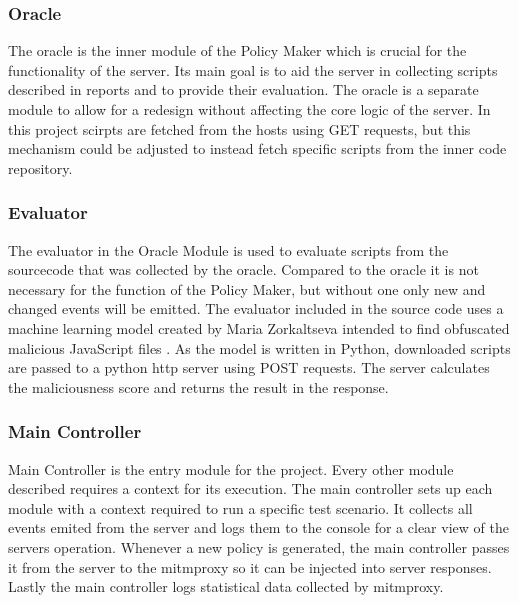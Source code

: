 \begin{description}
\subsubsection{Oracle}
The oracle is the inner module of the Policy Maker which is crucial for the functionality of the server.
Its main goal is to aid the server in collecting scripts described in reports and to provide their evaluation.
The oracle is a separate module to allow for a redesign without affecting the core logic of the server.
In this project scirpts are fetched from the hosts using GET requests, but this mechanism could be adjusted to instead fetch specific scripts from the inner code repository.

\subsubsection{Evaluator}
The evaluator in the Oracle Module is used to evaluate scripts from the sourcecode that was collected by the oracle.
Compared to the oracle it is not necessary for the function of the Policy Maker, but without one only new and changed events will be emitted.
The evaluator included in the source code uses a machine learning model created by Maria Zorkaltseva intended to find obfuscated malicious JavaScript files \cite{evaluator}.
As the model is written in Python, downloaded scripts are passed to a python http server using POST requests.
The server calculates the maliciousness score and returns the result in the response.


\subsubsection{Main Controller}
Main Controller is the entry module for the project.
Every other module described requires a context for its execution.
The main controller sets up each module with a context required to run a specific test scenario.
It collects all events emited from the server and logs them to the console for a clear view of the servers operation.
Whenever a new policy is generated, the main controller passes it from the server to the mitmproxy so it can be injected into server responses.
Lastly the main controller logs statistical data collected by mitmproxy.



\end{description}
